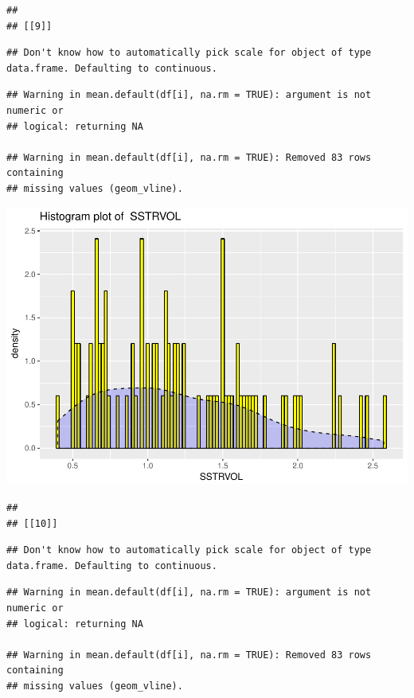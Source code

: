 \documentclass[]{article}
\begin{document}
\begin{verbatim}
## 
## [[9]]
\end{verbatim}

\begin{verbatim}
## Don't know how to automatically pick scale for object of type data.frame. Defaulting to continuous.
\end{verbatim}

\begin{verbatim}
## Warning in mean.default(df[i], na.rm = TRUE): argument is not numeric or
## logical: returning NA

## Warning in mean.default(df[i], na.rm = TRUE): Removed 83 rows containing
## missing values (geom_vline).
\end{verbatim}

\includegraphics{Desc_stats_files/figure-latex/unnamed-chunk-2-9.pdf}

\begin{verbatim}
## 
## [[10]]
\end{verbatim}

\begin{verbatim}
## Don't know how to automatically pick scale for object of type data.frame. Defaulting to continuous.
\end{verbatim}

\begin{verbatim}
## Warning in mean.default(df[i], na.rm = TRUE): argument is not numeric or
## logical: returning NA

## Warning in mean.default(df[i], na.rm = TRUE): Removed 83 rows containing
## missing values (geom_vline).
\end{verbatim}
\end{document}
